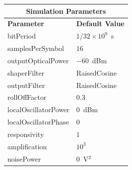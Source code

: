 \begin{refsection}
\begin{table}[H]
	\begin{tabular}{|l|l|}
		\hline
		\multicolumn{2}{|c|}{ \textbf{Simulation Parameters} } \\
		\hline
		\textbf{Parameter}     & \textbf{Default Value}                                     \\\hline
		bitPeriod              & $1/32\times10^9$~s														\\\hline
		samplesPerSymbol       & $16$                                                       \\\hline
		outputOpticalPower     & $-60$~dBm 													\\ \hline
		shaperFilter	       & RaisedCosine												\\ \hline
		outputFilter		   & RaisedCosine												\\ \hline
		rollOffFactor		   & 0.3														\\ \hline
		localOscillatorPower   & $0$~dBm                                                    \\ \hline
		localOscillatorPhase   & $0$                                                        \\ \hline
		responsivity           & $1$                                                        \\ \hline
		amplification          & $10^3$                                                     \\ \hline
		noisePower   & $0$~V$^2$                             					\\ \hline
	\end{tabular}
\end{table}
\begin{figure}[H]
	

\end{figure}
\end{refsection}
